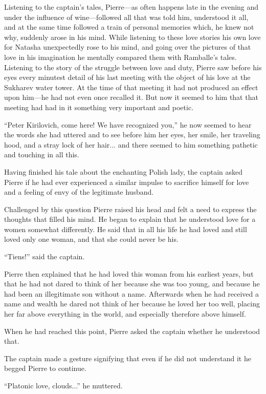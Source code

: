Listening to the captain's tales, Pierre---as often happens late
in the evening and under the influence of wine---followed all
that was told him, understood it all, and at the same time
followed a train of personal memories which, he knew not why,
suddenly arose in his mind. While listening to these love stories
his own love for Natasha unexpectedly rose to his mind, and going
over the pictures of that love in his imagination he mentally
compared them with Ramballe's tales. Listening to the story of
the struggle between love and duty, Pierre saw before his eyes
every minutest detail of his last meeting with the object of his
love at the Sukharev water tower. At the time of that meeting it
had not produced an effect upon him---he had not even once
recalled it. But now it seemed to him that that meeting had had
in it something very important and poetic.

``Peter Kirilovich, come here! We have recognized you,'' he now
seemed to hear the words she had uttered and to see before him
her eyes, her smile, her traveling hood, and a stray lock of her
hair... and there seemed to him something pathetic and touching
in all this.

Having finished his tale about the enchanting Polish lady, the
captain asked Pierre if he had ever experienced a similar impulse
to sacrifice himself for love and a feeling of envy of the
legitimate husband.

Challenged by this question Pierre raised his head and felt a
need to express the thoughts that filled his mind. He began to
explain that he understood love for a women somewhat
differently. He said that in all his life he had loved and still
loved only one woman, and that she could never be his.

``Tiens!'' said the captain.

Pierre then explained that he had loved this woman from his
earliest years, but that he had not dared to think of her because
she was too young, and because he had been an illegitimate son
without a name.  Afterwards when he had received a name and
wealth he dared not think of her because he loved her too well,
placing her far above everything in the world, and especially
therefore above himself.

When he had reached this point, Pierre asked the captain whether
he understood that.

The captain made a gesture signifying that even if he did not
understand it he begged Pierre to continue.

``Platonic love, clouds...'' he muttered.

